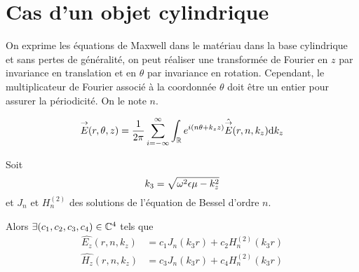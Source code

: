\section{Cas d'un objet cylindrique}


    \begin{figure}[!hbt]
        \centering
        \begin{tikzpicture}
            
        \end{tikzpicture}
    \end{figure}

    On exprime les équations de Maxwell dans le matériau dans la base cylindrique et sans pertes de généralité, on peut réaliser une transformée de Fourier en \(z\) par invariance en translation et en \(\theta\) par invariance en rotation.
    Cependant, le multiplicateur de Fourier associé à la coordonnée \(\theta\) doit être un entier pour assurer la périodicité. On le note \(n\).

    \begin{equation}
        \vE(r,\theta,z) = \frac{1}{2\pi}\sum_{i=-\infty}^{\infty}\int_{\RR} e^{i(n \theta + k_z z )}\hat{\vE} (r,n,k_z) \dd{k_z}
    \end{equation}

    \begin{prop}
        Soit
        \begin{equation}
            k_3 = \sqrt{\w^2\eps\mu - k_z^2}
        \end{equation}
        et \(J_n\) et \(H_n^{(2)}\) des solutions de l'équation de Bessel d'ordre \(n\).
        
        Alors \(\exists (c_1,c_2,c_3,c_4) \in \CC^4\) tels que 
        \begin{subequations}
            \begin{align}
                \hat{E_z}(r,n,k_z) &= c_1 J_n\left(k_3r\right) + c_2 H_n^{(2)}\left(k_3r\right)
                \\
                \hat{H_z}(r,n,k_z) &= c_3 J_n\left(k_3r\right) + c_4 H_n^{(2)}\left(k_3r\right)
            \end{align}
        \end{subequations}
    \end{prop}

